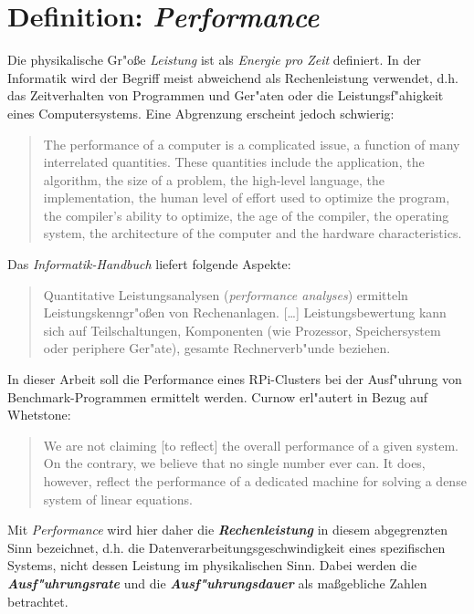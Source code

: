\section{Definition: \textit{Performance}}\label{Performance}

Die physikalische Gr"o\ss e \textit{Leistung} ist als \textit{Energie pro Zeit} definiert. In der Informatik wird der Begriff meist abweichend als Rechenleistung verwendet, d.h. das Zeitverhalten von Programmen und Ger"aten oder die Leistungsf"ahigkeit eines Computersystems. Eine Abgrenzung erscheint jedoch schwierig: 
\begin{quote}
\onehalfspacing
The performance of a computer is a complicated issue, a function of many interrelated quantities. These quantities include the application, the algorithm, the size of a problem, the high-level language, the implementation, the human level of effort used to optimize the program, the compiler's ability to optimize, the age of the compiler, the operating system, the architecture of the computer and the hardware characteristics. \cite{don03}
\end{quote}
Das \textit{Informatik-Handbuch} liefert folgende Aspekte:
\begin{quote} 
\onehalfspacing
Quantitative Leistungsanalysen (\textit{performance analyses}) ermitteln Leistungskenngr"o\ss en von Rechenanlagen. [\dots] Leistungsbewertung kann sich auf Teilschaltungen, Komponenten (wie Prozessor, Speichersystem oder periphere Ger"ate), gesamte Rechnerverb"unde beziehen. \cite{rec06}
\end{quote}
In dieser Arbeit soll die Performance eines RPi-Clusters bei der Ausf"uhrung von Benchmark-Programmen ermittelt werden. Curnow erl"autert in Bezug auf Whetstone: 
\begin{quote}
\onehalfspacing
We are not claiming [to reflect] the overall performance of a given system. On the contrary, we believe that no single number ever can. It does, however, reflect the performance of a dedicated machine for solving a dense system of linear equations. \cite{cur76}
\end{quote}
Mit \textit{Performance} wird hier daher die \textbf{\textit{Rechenleistung}} in diesem abgegrenzten Sinn bezeichnet, d.h. die Datenverarbeitungsgeschwindigkeit eines spezifischen Systems, nicht dessen Leistung im physikalischen Sinn. Dabei werden die \textbf{\textit{Ausf"uhrungsrate}} und die \textbf{\textit{Ausf"uhrungsdauer}} als ma\ss gebliche Zahlen betrachtet. 

